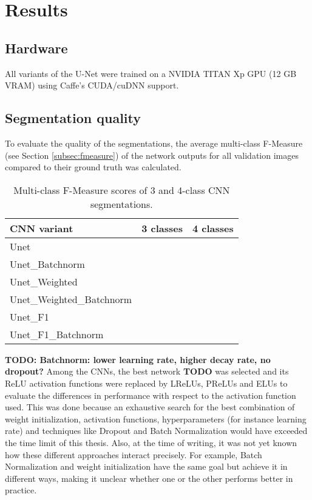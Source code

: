 \chapter {Results}
\label{chap:results}

	\section{Hardware}
All variants of the U-Net were trained on a NVIDIA TITAN Xp GPU (12 GB VRAM) using Caffe's CUDA/cuDNN support.

	\section {Segmentation quality}

To evaluate the quality of the segmentations, the average multi-class F-Measure (see Section \ref{subsec:fmeasure}) of the network outputs for all validation images compared to their ground truth was calculated.\\

\begin {table}
	\centering
	\begin {tabular}[!ht]{|l|c|c|}
		\hline
		\textbf{CNN variant}& \textbf{3 classes}& \textbf{4 classes}\\ \hline
		Unet& & \\ \hline
		Unet\_Batchnorm& & \\ \hline
		Unet\_Weighted& & \\ \hline
		Unet\_Weighted\_Batchnorm& & \\ \hline
		Unet\_F1& & \\ \hline
		Unet\_F1\_Batchnorm & & \\ \hline
	\end {tabular}
\caption[]{Multi-class F-Measure scores of 3 and 4-class CNN segmentations.}
\end {table}

\textbf{TODO: Batchnorm: lower learning rate, higher decay rate, no dropout?}
\noindent Among the CNNs, the best network \textbf{TODO} was selected and its ReLU activation functions were replaced by LReLUs, PReLUs and ELUs to evaluate the differences in performance with respect to the activation function used. This was done because an exhaustive search for the best combination of weight initialization, activation functions, hyperparameters (for instance learning rate) and techniques like Dropout and Batch Normalization would have exceeded the time limit of this thesis. Also, at the time of writing, it was not yet known how these different approaches interact precisely. For example, Batch Normalization and weight initialization have the same goal but achieve it in different ways, making it unclear whether one or the other performs better in practice.

